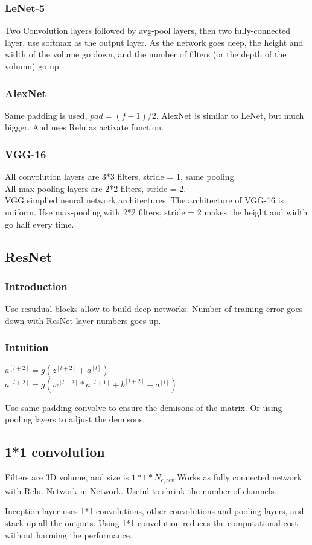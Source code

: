 \documentclass{article}
\begin{document}
		\subsubsection{LeNet-5}
			Two Convolution layers followed by avg-pool layers, then two fully-connected layer, use softmax as the output layer. As the network goes deep,
the height and width of the volume go down, and the number of filters (or the depth of the volumn) go up.
		\subsubsection{AlexNet}
			Same padding is used, $pad = (f - 1)/2$. AlexNet is similar to LeNet, but much bigger. And uses Relu as activate function.
		\subsubsection{VGG-16}
			All convolution layers are 3*3 filters, stride = 1, same pooling.\\
			All max-pooling layers are 2*2 filters, stride = 2.\\
			VGG simplied neural network architectures. The architecture of VGG-16 is uniform. Use max-pooling with 2*2 filters, stride = 2 makes the height and width go half every time.
	\subsection{ResNet}
		\subsubsection{Introduction}
			Use resudual blocks allow to build deep networks. Number of training error goes down with ResNet layer numbers goes up.
		\subsubsection{Intuition}
			\begin{center}
			$a^{[l+2]} = g(z^{[l+2]}+a^{[l]})$ \\
			$a^{[l+2]} = g(w^{[l+2]}*a^{[l+1]}+b^{[l+2]}+a^{[l]})$
			\end{center}
			\begin{flushleft}
				Use same padding convolve to ensure the demisons of the matrix. Or using pooling layers to adjust the demisons.
			\end{flushleft}
	\subsection{1*1 convolution}
		\begin{flushleft}
			Filters are 3D volume, and size is $1*1*N_{c_prev}$.Works as fully connected network with Relu. Network in Network. Useful to shrink the number of channels.
		\end{flushleft}
		\begin{flushleft}
			Inception layer uses 1*1 convolutions, other convolutions and pooling layers, and stack up all the outputs. Using 1*1 convolution reduces the computational cost without harming the performance.
		\end{flushleft}
\end{document}
